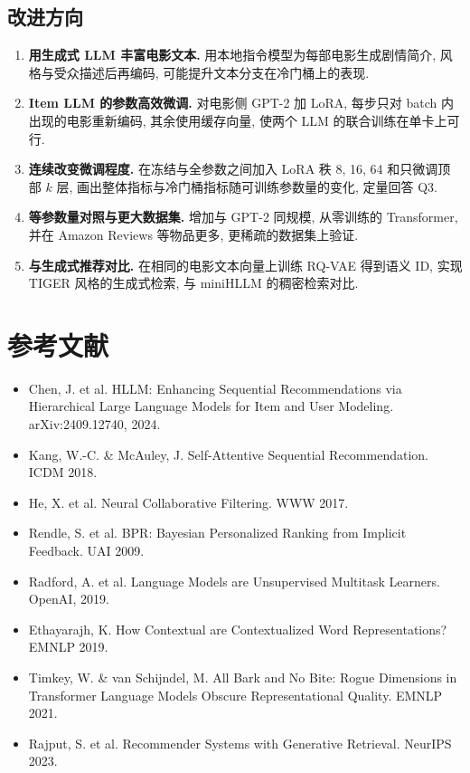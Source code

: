 \documentclass{article}
\begin{document}
\subsection{改进方向}
\label{sec:future}

\begin{enumerate}
  \item \textbf{用生成式 LLM 丰富电影文本.} 用本地指令模型为每部电影生成剧情简介, 风格与受众描述后再编码, 可能提升文本分支在冷门桶上的表现.
  \item \textbf{Item LLM 的参数高效微调.} 对电影侧 GPT-2 加 LoRA, 每步只对 batch 内出现的电影重新编码, 其余使用缓存向量, 使两个 LLM 的联合训练在单卡上可行.
  \item \textbf{连续改变微调程度.} 在冻结与全参数之间加入 LoRA 秩 8, 16, 64 和只微调顶部 $k$ 层, 画出整体指标与冷门桶指标随可训练参数量的变化, 定量回答 Q3.
  \item \textbf{等参数量对照与更大数据集.} 增加与 GPT-2 同规模, 从零训练的 Transformer, 并在 Amazon Reviews 等物品更多, 更稀疏的数据集上验证.
  \item \textbf{与生成式推荐对比.} 在相同的电影文本向量上训练 RQ-VAE 得到语义 ID, 实现 TIGER 风格的生成式检索, 与 miniHLLM 的稠密检索对比.
\end{enumerate}


\section*{参考文献}

\begin{itemize}
  \item Chen, J. et al. HLLM: Enhancing Sequential Recommendations via Hierarchical Large Language Models for Item and User Modeling. arXiv:2409.12740, 2024.
  \item Kang, W.-C. \& McAuley, J. Self-Attentive Sequential Recommendation. ICDM 2018.
  \item He, X. et al. Neural Collaborative Filtering. WWW 2017.
  \item Rendle, S. et al. BPR: Bayesian Personalized Ranking from Implicit Feedback. UAI 2009.
  \item Radford, A. et al. Language Models are Unsupervised Multitask Learners. OpenAI, 2019.
  \item Ethayarajh, K. How Contextual are Contextualized Word Representations? EMNLP 2019.
  \item Timkey, W. \& van Schijndel, M. All Bark and No Bite: Rogue Dimensions in Transformer Language Models Obscure Representational Quality. EMNLP 2021.
  \item Rajput, S. et al. Recommender Systems with Generative Retrieval. NeurIPS 2023.
\end{itemize}
\end{document}
